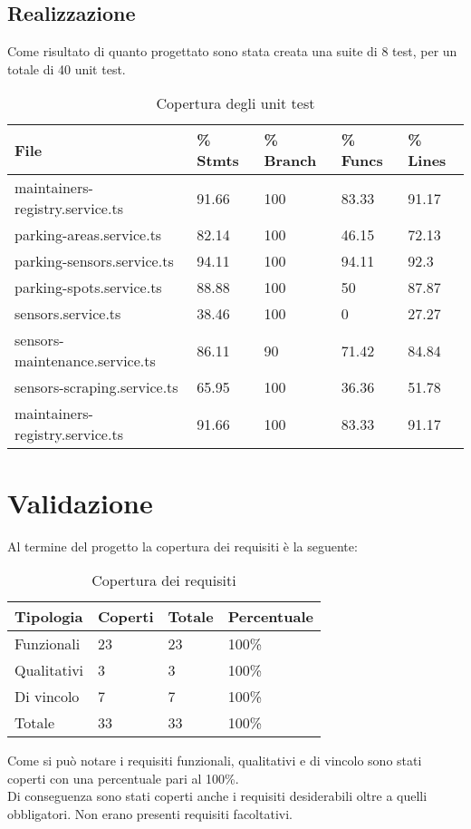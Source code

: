 \subsection{Realizzazione}
Come risultato di quanto progettato sono stata creata una suite di 8 test, per un totale di 40 unit test.
\begin{table}[H]
    \begin{tabular}{|p{4.8cm}|p{1.5cm}|p{1.7cm}|p{1.5cm}| p{1.4cm} |} 
    \hline
    \textbf{File} & \textbf{\% Stmts} & \textbf{\% Branch} &  \textbf{\% Funcs} & \textbf{\% Lines} \\ 
    \hline
    maintainers-registry.service.ts & 91.66 & 100 & 83.33 & 91.17 \\ 
    \hline
    parking-areas.service.ts & 82.14 & 100 & 46.15 & 72.13 \\ 
    \hline
    parking-sensors.service.ts & 94.11 & 100 & 94.11 & 92.3 \\ 
    \hline
    parking-spots.service.ts & 88.88 & 100 & 50 & 87.87 \\ 
    \hline
    sensors.service.ts & 38.46 & 100 & 0 & 27.27 \\ 
    \hline
    sensors-maintenance.service.ts & 86.11 & 90 & 71.42 & 84.84 \\ 
    \hline
    sensors-scraping.service.ts & 65.95 & 100 & 36.36 & 51.78 \\ 
    \hline
    maintainers-registry.service.ts & 91.66 & 100 & 83.33 & 91.17 \\ 
    \hline
    \end{tabular}
    \caption{Copertura degli unit test}
\end{table}

\section{Validazione}
Al termine del progetto la copertura dei requisiti è la seguente:
\begin{table}[H]
  \begin{tabular}{|p{5.2cm}|p{1.5cm}|p{1.3cm}|p{2.3cm}|} 
  \hline
  \textbf{Tipologia} & \textbf{Coperti} & \textbf{Totale} &  \textbf{Percentuale} \\ 
  \hline
  Funzionali & 23 & 23 & 100\% \\ 
  \hline
  Qualitativi & 3 & 3 & 100\% \\ 
  \hline
  Di vincolo & 7 & 7 & 100\% \\ 
  \hline
  \hline
  Totale & 33 & 33 & 100\% \\ 
  \hline
  \end{tabular}
  \caption{Copertura dei requisiti}
\end{table}
\leavevmode\newline
Come si può notare i requisiti funzionali, qualitativi e di vincolo sono stati coperti con una percentuale pari al 100\%.
\\
Di conseguenza sono stati coperti anche i requisiti desiderabili oltre a quelli obbligatori. Non erano presenti requisiti 
facoltativi.
